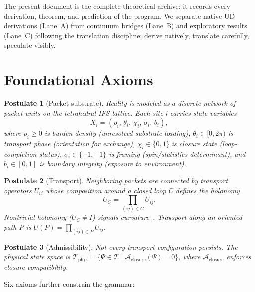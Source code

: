 \documentclass[11pt,twocolumn]{article}
\newtheorem{postulate}{Postulate}
\begin{document}
The present document is the complete theoretical archive: it records every derivation, theorem, and prediction of the program.
We separate native UD derivations (Lane~A) from continuum bridges (Lane~B) and exploratory results (Lane~C) following the translation discipline: derive natively, translate carefully, speculate visibly.

\section{Foundational Axioms}
\label{sec:axioms}

\begin{postulate}[Packet substrate]
\label{post:substrate}
Reality is modeled as a discrete network of packet units on the tetrahedral IFS lattice.
Each site $i$ carries state variables
\begin{equation}
X_i = (\rho_i,\,\theta_i,\,\chi_i,\,\sigma_i,\,b_i),
\label{eq:packet}
\end{equation}
where $\rho_i\geq 0$ is burden density (unresolved substrate loading), $\theta_i\in[0,2\pi)$ is transport phase (orientation for exchange), $\chi_i\in\{0,1\}$ is closure state (loop-completion status), $\sigma_i\in\{+1,-1\}$ is framing (spin/statistics determinant), and $b_i\in[0,1]$ is boundary integrity (exposure to environment).
\end{postulate}

\begin{postulate}[Transport]
\label{post:transport}
Neighboring packets are connected by transport operators $U_{ij}$ whose composition around a closed loop $C$ defines the holonomy
\begin{equation}
U_C = \prod_{(ij)\in C} U_{ij}.
\label{eq:holonomy}
\end{equation}
Nontrivial holonomy ($U_C\neq I$) signals curvature~\cite{wilson1974}.
Transport along an oriented path $P$ is $U(P)=\prod_{(ij)\in P}U_{ij}$.
\end{postulate}

\begin{postulate}[Admissibility]
\label{post:admissibility}
Not every transport configuration persists.
The physical state space is
$\mathcal{T}_{\mathrm{phys}}=\{\Psi\in\mathcal{T}\mid\mathcal{A}_{\mathrm{closure}}(\Psi)=0\}$,
where $\mathcal{A}_{\mathrm{closure}}$ enforces closure compatibility.
\end{postulate}

Six axioms further constrain the grammar:
\end{document}
